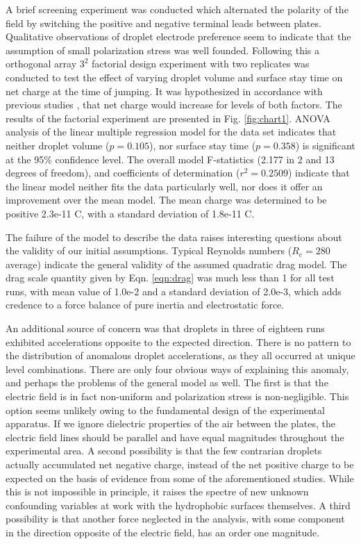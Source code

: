 \documentclass{jfm}
\begin{document}
A brief screening experiment was conducted which alternated the polarity of the field by switching the positive and negative terminal leads between plates. Qualitative observations of droplet electrode preference seem to indicate that the assumption of small polarization stress was well founded. Following this a orthogonal array $3^2$ factorial design experiment with two replicates was conducted to test the effect of varying droplet volume and surface stay time on net charge at the time of jumping. It was hypothesized in accordance with previous studies \cite{Choi:2013dg}, that net charge would increase for levels of both factors. The results of the factorial experiment are presented in Fig. \ref{fig:chart1}. ANOVA analysis of the linear multiple regression model for the data set  indicates that neither droplet volume ($p=0.105$), nor surface stay time ($p=0.358$) is significant at the 95\% confidence level. The overall model F-statistics (2.177 in 2 and 13 degrees of freedom), and coefficients of determination ($r^2 = 0.2509$) indicate that the linear model neither fits the data particularly well, nor does it offer an improvement over the mean model. The mean charge was determined to be positive 2.3e-11 C, with a standard deviation of 1.8e-11 C.

The failure of the model to describe the data raises interesting questions about the validity of our initial assumptions. Typical Reynolds numbers ($R_e=280$ average) indicate the general validity of the assumed quadratic drag model. The drag scale quantity given by Eqn. \ref{eqn:drag} was much less than 1 for all test runs, with mean value of 1.0e-2 and a standard deviation of 2.0e-3, which adds credence to a force balance of pure inertia and electrostatic force.

An additional source of concern was that droplets in three of eighteen runs exhibited accelerations opposite to the expected direction. There is no pattern to the distribution of anomalous droplet accelerations, as they all occurred at unique level combinations. There are only four obvious ways of explaining this anomaly, and perhaps the problems of the general model as well. The first is that the electric field is in fact non-uniform and polarization stress is non-negligible. This option seems unlikely owing to the fundamental design of the experimental apparatus. If we ignore dielectric properties of the air between the plates, the electric field lines should be parallel and have equal magnitudes throughout the experimental area. A second possibility is that the few contrarian droplets actually accumulated net negative charge, instead of the net positive charge to be expected on the basis of evidence from some of the aforementioned studies. While this is not impossible in principle, it raises the spectre of new unknown confounding variables at work with the hydrophobic surfaces themselves. A third possibility is that another force neglected in the analysis, with some component in the direction opposite of the electric field, has an order one magnitude. 
\end{document}
